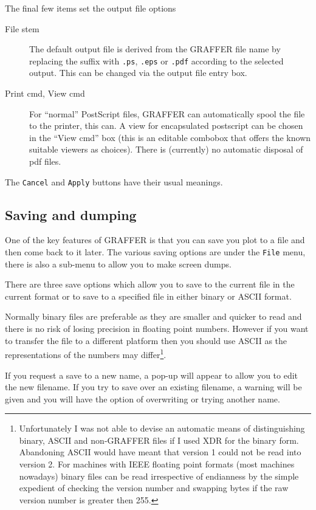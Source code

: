 \documentclass[11pt,twoside,english]{article}
\begin{document}
The final few items set the output file options
\begin{description}
\item[File stem] The default output file is derived from the GRAFFER
  file name by replacing the suffix with \texttt{.ps}, \texttt{.eps} or
  \texttt{.pdf} according to the selected output. This can be changed
  via the output file entry box.
\item[Print cmd, View cmd] 
 For ``normal'' PostScript files, GRAFFER can automatically spool
 the file to the printer, this can.  A view for encapsulated postscript
 can be chosen in the ``View cmd'' box (this is an editable combobox
 that offers the known suitable viewers as choices). There is
 (currently) no automatic disposal of pdf files.
\end{description}


The \texttt{Cancel} and \texttt{Apply} buttons have their usual
meanings.


\subsection{Saving and dumping}

One of the key features of GRAFFER is that you can save you plot to a
file and then come back to it later. The various saving options are
under the \texttt{File} menu, there is also a sub-menu to allow you to
make screen dumps.

There are three save options which allow you to save to the current
file in the current format or to save to a specified file in either
binary or ASCII format.

Normally binary files are preferable as they are smaller and quicker to
read and there is no risk of losing precision in floating point
numbers. However if you want to transfer the file to a different
platform then you should use ASCII as the representations of the
numbers may differ\footnote{Unfortunately I was not able to devise an
  automatic means of distinguishing binary, ASCII and non-GRAFFER files
  if I used XDR for the binary form.  Abandoning ASCII would have meant
  that version 1 could not be read into version 2. For machines with
  IEEE floating point formats (most machines nowadays) binary files can
  be read irrespective of endianness by the simple expedient of
  checking the version number and swapping bytes if the raw version
  number is greater then 255.}.

If you request a save to a new name, a pop-up will appear to allow you
to edit the new filename. If you try to save over an existing filename,
a warning will be given and you will have the option of overwriting or
trying another name.
\end{document}
